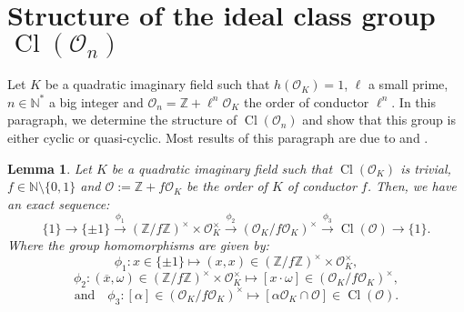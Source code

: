 \documentclass[a4paper,10pt,notitlepage]{report}
\theoremstyle{definition}
\theoremstyle{plain}
\newtheorem{Lemma}[Definition]{Lemma}
\theoremstyle{definition}
\newcommand{\N}{\mathbb{N}}
\newcommand{\Z}{\mathbb{Z}}
\newcommand{\mO}{\mathcal{O}}
\renewcommand{\(}{\left(}
\renewcommand{\)}{\right)}
\DeclareMathOperator{\Cl}{Cl}
\begin{document}
\section{Structure of the ideal class group $\Cl(\mO_n)$}\label{Appendix 1}

Let $K$ be a quadratic imaginary field such that $h(\mO_K)=1$, $\ell$ a small prime, $n\in\N^*$ a big integer and $\mO_n=\Z+\ell^n\mO_K$ the order of conductor $\ell^n$.  In this paragraph, we determine the structure of $\Cl(\mO_n)$ and show that this group is either cyclic or quasi-cyclic. Most results of this paragraph are due to \cite[chapter 7]{Cox} and \cite[chapter 4]{Cohen2}.

\begin{Lemma}
Let $K$ be a quadratic imaginary field such that $\Cl(\mO_K)$ is trivial, $f\in\N\setminus\{0,1\}$ and $\mO:=\Z+f\mO_K$ be the order of $K$ of conductor $f$. Then, we have an exact sequence:
\[\{1\}\longrightarrow\{\pm 1\}\overset{\phi_1}{\longrightarrow} (\Z/f\Z)^\times\times \mO_K^\times\overset{\phi_2}{\longrightarrow} (\mO_K/f\mO_K)^\times\overset{\phi_3}{\longrightarrow} \Cl(\mO)\longrightarrow\{1\}.\]
Where the group homomorphisms are given by:
\[\phi_1:x\in\{\pm 1\}\longmapsto (x,x)\in (\Z/f\Z)^\times\times \mO_K^\times,\]
\[\phi_2:(\overline{x},\omega)\in (\Z/f\Z)^\times\times \mO_K^\times\longmapsto [x\cdot \omega]\in(\mO_K/f\mO_K)^\times,\]
\[\mbox{and} \quad \phi_3:[\alpha]\in(\mO_K/f\mO_K)^\times\longmapsto [\alpha\mO_K\cap\mO]\in \Cl(\mO).\]
\end{Lemma}
\end{document}

